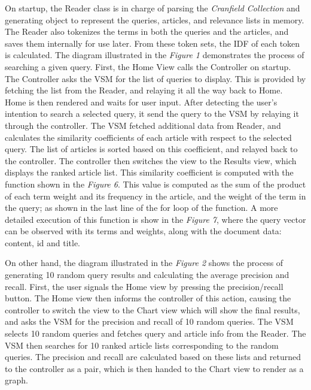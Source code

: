 \documentclass{article}
\begin{document}
On startup, the Reader class is in charge of parsing the \textit{Cranfield Collection} and generating object to represent the queries, articles, and relevance lists in memory. The Reader also tokenizes the terms in both the queries and the articles, and saves them internally for use later. From these token sets, the IDF of each token is calculated. The diagram illustrated in the \textit{Figure 1} demonstrates the process of searching a given query. First, the Home View calls the Controller on startup. The Controller asks the VSM for the list of queries to display. This is provided by fetching the list from the Reader, and relaying it all the way back to Home. Home is then rendered and waits for user input. After detecting the user's intention to search a selected query, it send the query to the VSM by relaying it through the controller. The VSM fetched additional data from Reader, and calculates the similarity coefficients of each article with respect to the selected query. The list of articles is sorted based on this coefficient, and relayed back to the controller. The controller then switches the view to the Results view, which displays the ranked article list. This similarity coefficient is computed with the function shown in the \textit{Figure 6}. This value is computed as the sum of the product of each term weight and its frequency in the article, and the weight of the term in the query; as shown in the last line of the for loop of the function. A more detailed execution of this function is show in the \textit{Figure 7}, where the query vector can be observed with its terms and weights, along with the document data: content, id and title.

On other hand, the diagram illustrated in the \textit{Figure 2} shows the process of generating 10 random query results and calculating the average precision and recall. First, the user signals the Home view by pressing the precision/recall button. The Home view then informs the controller of this action, causing the controller to switch the view to the Chart view which will show the final results, and asks the VSM for the precision and recall of 10 random queries. The VSM selects 10 random queries and fetches query and article info from the Reader. The VSM then searches for 10 ranked article lists corresponding to the random queries. The precision and recall are calculated based on these lists and returned to the controller as a pair, which is then handed to the Chart view to render as a graph.
\end{document}
